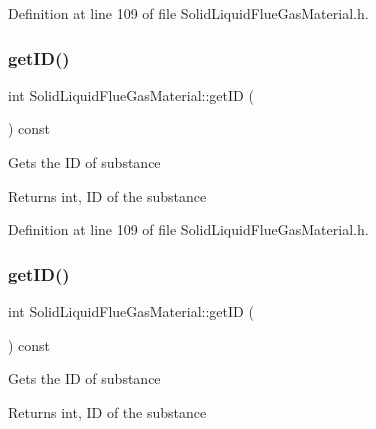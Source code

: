 Definition at line 109 of file Solid\+Liquid\+Flue\+Gas\+Material.\+h.

\mbox{\label{class_solid_liquid_flue_gas_material_afb124b546137da7ba99e31616198e0c8}} 
\subsubsection{\texorpdfstring{get\+I\+D()}{getID()}\hspace{0.1cm}{\footnotesize\ttfamily [2/3]}}
{\footnotesize\ttfamily int Solid\+Liquid\+Flue\+Gas\+Material\+::get\+ID (\begin{DoxyParamCaption}{ }\end{DoxyParamCaption}) const\hspace{0.3cm}{\ttfamily [inline]}}

Gets the ID of substance \begin{DoxyReturn}{Returns}
int, ID of the substance 
\end{DoxyReturn}


Definition at line 109 of file Solid\+Liquid\+Flue\+Gas\+Material.\+h.

\mbox{\label{class_solid_liquid_flue_gas_material_afb124b546137da7ba99e31616198e0c8}} 
\subsubsection{\texorpdfstring{get\+I\+D()}{getID()}\hspace{0.1cm}{\footnotesize\ttfamily [3/3]}}
{\footnotesize\ttfamily int Solid\+Liquid\+Flue\+Gas\+Material\+::get\+ID (\begin{DoxyParamCaption}{ }\end{DoxyParamCaption}) const\hspace{0.3cm}{\ttfamily [inline]}}

Gets the ID of substance \begin{DoxyReturn}{Returns}
int, ID of the substance 
\end{DoxyReturn}


